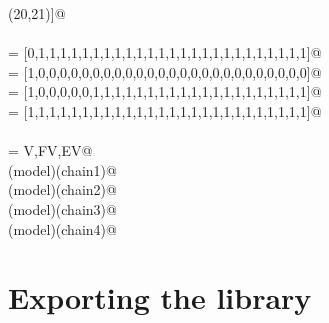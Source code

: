 \documentclass[11pt,oneside]{article}	%
\begin{document}
\begin{flushleft}
\begin{list}{}{}
\mbox{}\verb@(20,21)]@\\
\mbox{}\verb@@\\
\mbox{} = [0,1,1,1,1,1,1,1,1,1,1,1,1,1,1,1,1,1,1,1,1,1,1,1,1,1]@\\
\mbox{} = [1,0,0,0,0,0,0,0,0,0,0,0,0,0,0,0,0,0,0,0,0,0,0,0,0,0]@\\
\mbox{} = [1,0,0,0,0,0,1,1,1,1,1,1,1,1,1,1,1,1,1,1,1,1,1,1,1,1]@\\
\mbox{} = [1,1,1,1,1,1,1,1,1,1,1,1,1,1,1,1,1,1,1,1,1,1,1,1,1,1]@\\
\mbox{}\verb@@\\
\mbox{}\verb@model = V,FV,EV@\\
\mbox{}\verb@viewLarComplexChain(model)(chain1)@\\
\mbox{}\verb@viewLarComplexChain(model)(chain2)@\\
\mbox{}\verb@viewLarComplexChain(model)(chain3)@\\
\mbox{}\verb@viewLarComplexChain(model)(chain4)@\\
\mbox{}\verb@@{\NWsep}
\end{list}
\vspace{-2ex}
\end{flushleft}


\section{Exporting the library}
\end{document}
